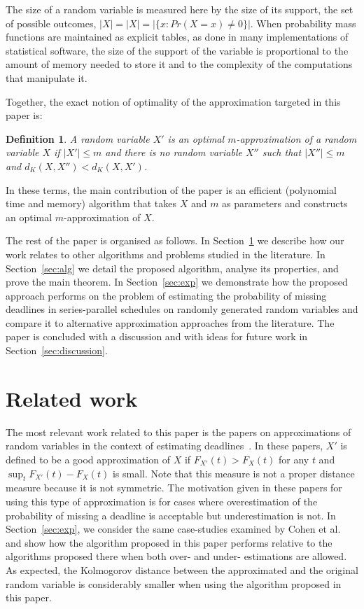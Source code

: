 \documentclass[letterpaper]{article} %
\newtheorem{definition}[thm]{Definition}
\begin{document}
The size of a random variable is measured here by the size of its support, the set of possible outcomes, $|X|=|X|=|\{x\colon Pr(X=x) \neq 0\}|$. When probability mass functions are maintained as explicit tables, as done in many implementations of statistical software, the size of the support of the variable is proportional to the amount of memory needed to store it and to the complexity of the computations that manipulate it. 

Together, the exact notion of optimality of the approximation targeted in this paper is:
\begin{definition}
	A random variable $X'$ is an optimal $m$-approximation of a random variable $X$ if $|X'| \leq m$ and there is no random variable $X''$ such that $|X''| \leq m$ and $d_K(X,X'') < d_K(X,X')$.
\end{definition}

In these terms, the main contribution of the paper is an efficient (polynomial time and memory) algorithm that takes $X$ and $m$ as parameters and constructs an optimal $m$-approximation of $X$.

The rest of the paper is organised as follows. In Section~\ref{sec:relwork} we describe how our work relates to other algorithms and problems studied in the literature. In Section~\ref{sec:alg} we detail the proposed algorithm, analyse its properties, and prove the main theorem. In Section~\ref{sec:exp} we demonstrate how the proposed approach performs on the problem of estimating the probability of missing deadlines in series-parallel schedules on randomly generated random variables and compare it to alternative approximation approaches from the literature. The paper is concluded with a discussion and with ideas for future work in Section~\ref{sec:discussion}.

\section{Related work}\label{sec:relwork}
The most relevant work related to this paper is the papers on approximations of random variables in the context of estimating deadlines~\cite{cohen2015estimating,CohenGW18}. In these papers, $X'$ is defined to be a good approximation of $X$ if $F_{X'}(t) > F_{X}(t)$ for any $t$ and $\sup_t F_{X'}(t) - F_{X}(t)$ is small. Note that this measure is not a proper distance measure because it is not symmetric. The motivation given in these papers for using this type of approximation is for cases where overestimation of the probability of missing a deadline is acceptable but underestimation is not. In Section~\ref{sec:exp}, we consider the same case-studies examined by Cohen et al. and show how the algorithm proposed in this paper performs relative to the algorithms proposed there when both over- and under- estimations are allowed. As expected, the Kolmogorov distance between the approximated and the original random variable is considerably smaller when using the algorithm proposed in this paper. 
\end{document}
